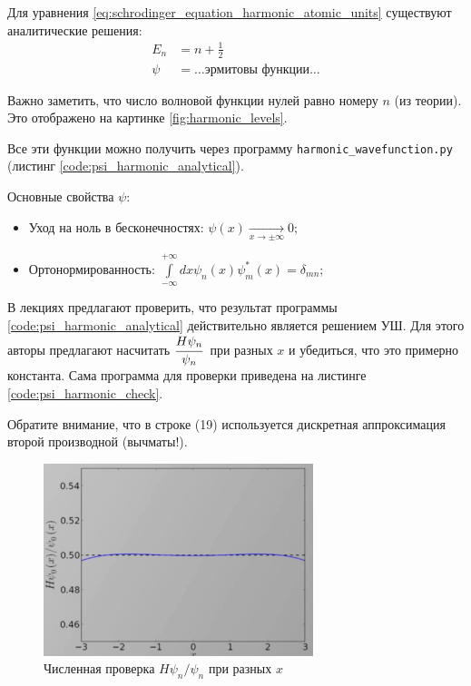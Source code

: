 \begin{lecture}
Для уравнения \eqref{eq:schrodinger_equation_harmonic_atomic_units} существуют аналитические решения:
\begin{align}
    E_n &= n + \frac{1}{2} \\
    \psi &= \dots \text{эрмитовы функции} \dots
\end{align}

Важно заметить, что число волновой функции нулей равно номеру $n$ (из теории).
Это отображено на картинке \ref{fig:harmonic_levels}.

Все эти функции можно получить через программу \texttt{harmonic\_wavefunction.py} (листинг \ref{code:psi_harmonic_analytical}).

Основные свойства $\psi$:
\begin{itemize}
    \item Уход на ноль в бесконечностях: $\psi (x) \xrightarrow[x\rightarrow \pm \infty]{} 0$;
    \item Ортонормированность: $\int\limits_{- \infty}^{+\infty} dx \psi_n (x) \psi_m^* (x) = \delta_{mn}$;
\end{itemize}

В лекциях предлагают проверить, что результат программы \ref{code:psi_harmonic_analytical} действительно является решением УШ.
Для этого авторы предлагают насчитать $\cfrac{H \psi_{n}}{\psi_{n} }\, $ при разных $x$ и убедиться, что это примерно константа.
Сама программа для проверки приведена на листинге \ref{code:psi_harmonic_check}.


Обратите внимание, что в строке (19) используется дискретная аппроксимация второй производной (вычматы!).
\begin{figure}[!h]
    \label{fig:harmonic_check}
    \centering
    \includegraphics[width=0.7\textwidth]{fig/harmonic_check}
    \caption{Численная проверка $H \psi_{n} / \psi_n$ при разных $x$}
\end{figure}


\end{lecture}
